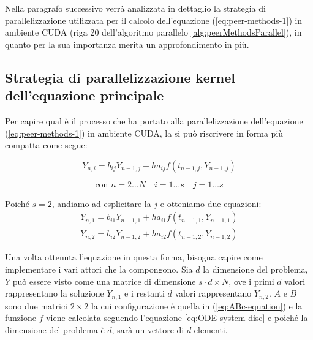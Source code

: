 \noindent Nella paragrafo successivo verrà analizzata in dettaglio la strategia di parallelizzazione utilizzata per il calcolo dell'equazione (\ref{eq:peer-methods-1}) in ambiente CUDA (riga 20 dell'algoritmo parallelo \ref{alg:peerMethodsParallel}), in quanto per la sua importanza merita un approfondimento in più.

\subsection{Strategia di parallelizzazione kernel dell'equazione principale } \label{computeYGPU-par}
\noindent Per capire qual è il processo che ha portato alla parallelizzazione dell'equazione (\ref{eq:peer-methods-1}) in ambiente CUDA, la si può riscrivere in forma più compatta come segue:

\begin{equation}
    Y_{n, i} =  b_{ij}Y_{n - 1, j} + h a_{ij} f(t_{n - 1, j}, Y_{n - 1, j})
    \label{eq:parallel-peer-methods-compressed}
\end{equation}

\begin{equation*}
    \text{con } n = 2\ldots N \quad i = 1\ldots s \quad j = 1\ldots s \nonumber
\end{equation*}

\noindent Poiché $s = 2$, andiamo ad esplicitare la $j$ e otteniamo due equazioni:
\begin{gather}
    Y_{n, 1} =  b_{i1}Y_{n - 1, 1} + h a_{i1} f(t_{n - 1, 1}, Y_{n - 1, 1}) \nonumber \\ 
    Y_{n, 2} =  b_{i2}Y_{n - 1, 2} + h a_{i2} f(t_{n - 1, 2}, Y_{n - 1, 2})
    \label{eq:parallel-peer-methods-unrolled}
\end{gather}

\noindent Una volta ottenuta l'equazione in questa forma, bisogna capire come implementare i vari attori che la compongono. Sia $d$ la dimensione del problema, $Y$ può essere visto come una matrice di dimensione $s \cdot d \times N$, ove i primi $d$ valori rappresentano la soluzione $Y_{n,1}$ e i restanti $d$ valori rappresentano $Y_{n,2}$. $A$ e $B$ sono due matrici $2 \times 2$ la cui configurazione è quella in (\ref{eq:ABc-equation}) e la funzione $f$ viene calcolata seguendo l'equazione \eqref{eq:ODE-system-disc} e poiché la dimensione del problema è $d$, sarà un vettore di $d$ elementi.

